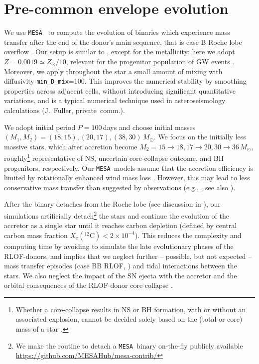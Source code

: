 \documentclass[twocolumn,twocolappendix,trackchanges]{aastex63}
\newcommand{\code}[1]{\texttt{#1}}
\newcommand{\mesa}{\code{MESA}}
\begin{document}
\section{Pre-common envelope evolution}
\label{sec:methods}

We use \mesa\ \citep[version 15140,][]{paxton:2011, paxton:2013,
  paxton:2015, paxton:2018, paxton:2011} to compute the evolution of
binaries which experience mass transfer after the end of the donor's
main sequence, that is case B Roche lobe overflow
\citep[RLOF,][]{kippenhahn:1967}. Our setup is similar to \cite{renzo:2021zoph},
except for the metallicity: here we adopt $Z=0.0019\simeq Z_\odot/10$,
relevant for the progenitor population of GW events
\citep[e.g.,][]{vanson:2021}. Moreover, we apply throughout the star a
small amount of mixing with diffusivity \texttt{min\_D\_mix}=100. This
improves the numerical stability by smoothing properties across
adjacent cells, without introducing significant quantitative
variations, and is a typical numerical technique used in
asteroseismology calculations (J.~Fuller, private~comm.).

We adopt initial period $P=100$\,days and choose initial masses
$(M_{1}, M_{2}) = (18, 15), (20, 17), (38, 30)\,M_\odot$. We focus on
the initially less massive stars, which after accretion become
$M_2=15\rightarrow 18, 17\rightarrow 20, 30\rightarrow 36\,M_\odot$,
roughly\footnote{Whether a core-collapse results in NS or BH
  formation, with or without an associated explosion, cannot be
  decided solely based on the (total or core) mass of a star
  \citep[e.g.,][]{oconnor:11, farmer:16, patton:20, zapartas:21b,
    patton:22}. } representative of NS, uncertain core-collapse
outcome, and BH progenitors, respectively. Our \mesa\ models assume
that the accretion efficiency is limited by rotationally enhanced wind
mass loss \citep[e.g.,][]{sravan:2019, wang:2020, renzo:2021zoph,
  sen:2022}. However, this may lead to less conservative mass transfer
than suggested by observations (e.g., \citealt{wang:2021a}, see also
 \citealt{renzo:2021zoph}).

 After the binary detaches from the Roche lobe (see discussion in
 \citealt{renzo:2021zoph}), our simulations artificially
 detach\footnote{We make the routine to detach a \mesa\ binary
   on-the-fly publicly available
   \url{https://github.com/MESAHub/mesa-contrib/}} the stars and
 continue the evolution of the accretor as a single star until it
 reaches carbon depletion (defined by central carbon mass fraction
 $X_\mathrm{c}(^{12}\mathrm{C})<2\times10^{-4} $).
 This reduces the complexity and computing time by avoiding to simulate the
late evolutionary phases of the RLOF-donors, and implies that
 we neglect further -- possible, but not expected -- mass transfer
 episodes (case BB RLOF, \citealt{laplace:2020}) and tidal
 interactions between the stars. We also neglect the impact of the SN
 ejecta with the accretor \cite[e.g.,][]{hirai:2018, ogata:2021} and
 the orbital consequences of the RLOF-donor core-collapse
 \citep[e.g.,][]{brandt:1995, kalogera:1996, tauris:1998,
   renzo:2019walk}.
\end{document}

